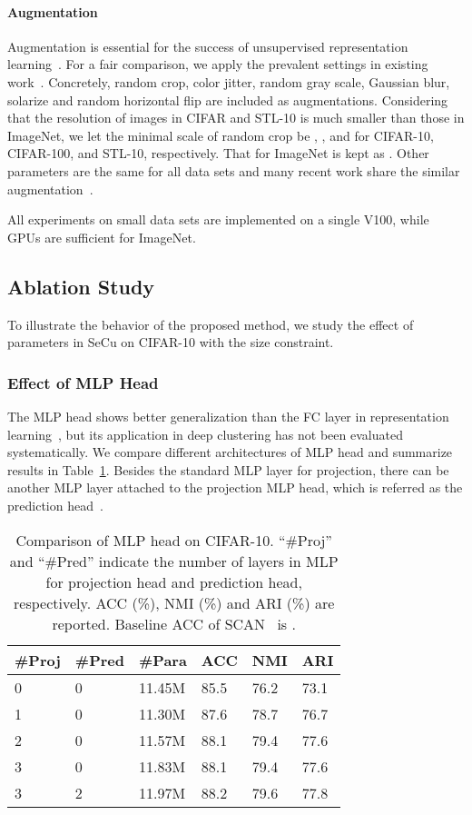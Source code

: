 \documentclass[10pt,twocolumn,letterpaper]{article}
\begin{document}
\paragraph{Augmentation} Augmentation is essential for the success of unsupervised representation learning~\cite{ChenK0H20}. For a fair comparison, we apply the prevalent settings in existing work~\cite{ChenK0H20,GrillSATRBDPGAP20}. Concretely, random crop, color jitter, random gray scale, Gaussian blur, solarize and random horizontal flip are included as augmentations. Considering that the resolution of images in CIFAR and STL-10 is much smaller than those in ImageNet, we let the minimal scale of random crop be , , and  for CIFAR-10, CIFAR-100, and STL-10, respectively. That for ImageNet is kept as . Other parameters are the same for all data sets and many recent work share the similar augmentation~\cite{abs-2104-02057,GrillSATRBDPGAP20,coke,ZhongW0HDNL021}. 

All experiments on small data sets are implemented on a single V100, while  GPUs are sufficient for ImageNet.

\subsection{Ablation Study}
To illustrate the behavior of the proposed method, we study the effect of parameters in SeCu on CIFAR-10 with the size constraint.

\subsubsection{Effect of MLP Head}\label{sec:mlp}
The MLP head shows better generalization than the FC layer in representation learning~\cite{ChenK0H20}, but its application in deep clustering has not been evaluated systematically. We compare different architectures of MLP head and summarize results in Table~\ref{ta:mlp}. Besides the standard MLP layer for projection, there can be another MLP layer attached to the projection MLP head, which is referred as the prediction head~\cite{GrillSATRBDPGAP20}.


\begin{table}[!ht]
\centering
\begin{tabular}{|l|l|l|l|l|l|}\hline
\#Proj&\#Pred&\#Para&ACC&NMI&ARI\\\hline
0&0&11.45M&85.5&76.2&73.1\\
1&0&11.30M&87.6&78.7&76.7\\
2&0&11.57M&88.1&79.4&77.6\\
3&0&11.83M&88.1&79.4&77.6\\
3&2&11.97M&88.2&79.6&77.8\\\hline
\end{tabular}
\caption{Comparison of MLP head on CIFAR-10. ``\#Proj'' and ``\#Pred'' indicate the number of layers in MLP for projection head and prediction head, respectively. ACC (\%), NMI (\%) and ARI (\%) are reported. Baseline ACC of SCAN~\cite{GansbekeVGPG20} is .}\label{ta:mlp}
\end{table}
\end{document}
